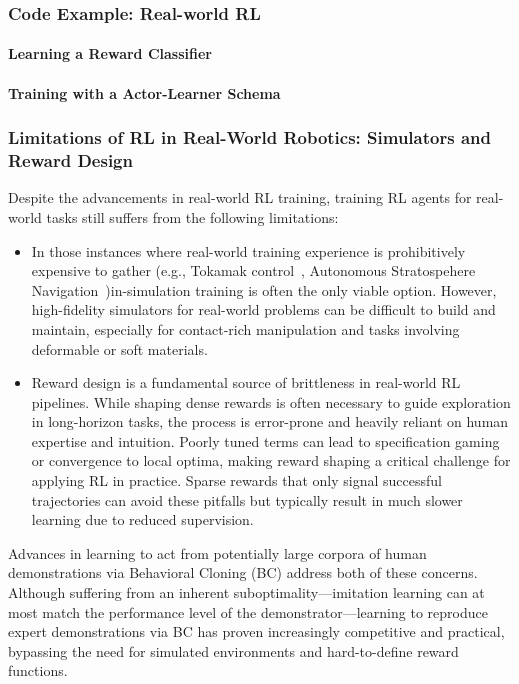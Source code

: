 \subsubsection{Code Example: Real-world RL}




\paragraph{Learning a Reward Classifier}

\paragraph{Training with a Actor-Learner Schema}


\subsubsection{Limitations of RL in Real-World Robotics: Simulators and Reward Design}

Despite the advancements in real-world RL training, training RL agents for real-world tasks still suffers from the following limitations:
\begin{itemize}
\item In those instances where real-world training experience is prohibitively expensive to gather (e.g., Tokamak control~\citep{degraveMagneticControlTokamak2022}, Autonomous Stratospehere Navigation~\citep{bellemareAutonomousNavigationStratospheric2020})in-simulation training is often the only viable option. 
However, high-fidelity simulators for real-world problems can be difficult to build and maintain, especially for contact-rich manipulation and tasks involving deformable or soft materials.

\item Reward design is a fundamental source of brittleness in real-world RL pipelines. While shaping dense rewards is often necessary to guide exploration in long-horizon tasks, the process is error-prone and heavily reliant on human expertise and intuition. Poorly tuned terms can lead to specification gaming or convergence to local optima, making reward shaping a critical challenge for applying RL in practice. Sparse rewards that only signal successful trajectories can avoid these pitfalls but typically result in much slower learning due to reduced supervision.
\end{itemize}

Advances in learning to act from potentially large corpora of human demonstrations via Behavioral Cloning (BC) address both of these concerns.
Although suffering from an inherent suboptimality---imitation learning can at most match the performance level of the demonstrator---learning to reproduce expert demonstrations via BC has proven increasingly competitive and practical, bypassing the need for simulated environments and hard-to-define reward functions.
